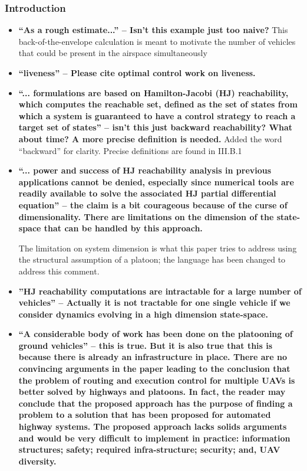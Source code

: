 \documentclass[submit]{aiaa-pretty}
\begin{document}
\subsubsection{Introduction}
\begin{itemize}
\item \textbf{``As a rough estimate...'' – Isn’t this example just too naive?}
This back-of-the-envelope calculation is meant to motivate the number of vehicles that could be present in the airspace simultaneously

\item \textbf{“liveness” – Please cite optimal control work on liveness.}

\item \textbf{``... formulations are based on Hamilton-Jacobi (HJ) reachability, which computes the reachable set, defined as the set of states from which a system is guaranteed to have a control strategy to reach a target set of states'' – isn’t this just backward reachability? What about time? A more precise definition is needed.}
Added the word ``backward'' for clarity. Precise definitions are found in III.B.1

\item \textbf{``... power and success of HJ reachability analysis in previous applications cannot be denied, especially since numerical tools are readily available to solve the associated HJ partial differential equation'' – the claim is a bit courageous because of the curse of dimensionality. There are limitations on the dimension of the state-space that can be handled by this approach.}

The limitation on system dimension is what this paper tries to address using the structural assumption of a platoon; the language has been changed to address this comment.

\item \textbf{''HJ reachability computations are intractable for a large number of vehicles'' – Actually it is not tractable for one single vehicle if we consider dynamics evolving in a high dimension state-space.}

\item \textbf{``A considerable body of work has been done on the platooning of ground vehicles'' – this is true. But it is also true that this is because there is already an infrastructure in place. There are no convincing arguments in the paper leading to the conclusion that the problem of routing and execution control for multiple UAVs is better solved by highways and platoons. In fact, the reader may conclude that the proposed approach has the purpose of finding a problem to a solution that has been proposed for automated highway systems. The proposed approach lacks solids arguments and would be very difficult to implement in practice: information structures; safety; required infra-structure; security; and, UAV diversity.}


\end{itemize}
\end{document}
